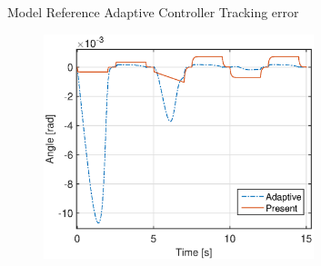 \documentclass[10pt]{beamer}
\begin{document}
\begin{frame}{Model Reference Adaptive Controller}
  Tracking error
  \begin{figure}[h!]
    \centering
    \includegraphics[width=0.7\textwidth]{../fig/matlab/modelerrorperiodic_trackingerror.eps}
  \end{figure}
\end{frame}
\end{document}
